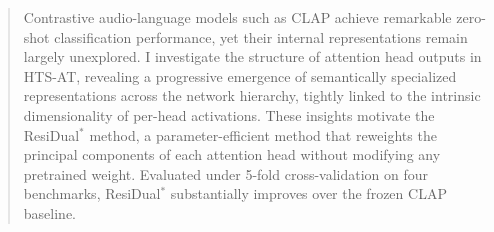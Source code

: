 \documentclass{article}
\begin{document}

\printAffiliationsAndNotice{}

\begin{abstract}
Contrastive audio-language models such as CLAP achieve remarkable zero-shot 
classification performance, yet their internal representations remain largely 
unexplored. I investigate the structure of attention head outputs in HTS-AT, 
revealing a progressive emergence of semantically specialized representations 
across the network hierarchy, tightly linked to the intrinsic dimensionality 
of per-head activations. These insights motivate the ResiDual$^*$ method, a parameter-efficient 
method that reweights the principal components of each attention head without 
modifying any pretrained weight. Evaluated under 5-fold cross-validation on 
four benchmarks, ResiDual$^*$ substantially improves over the frozen CLAP baseline.
\end{abstract}




%




\pagebreak



\end{document}
